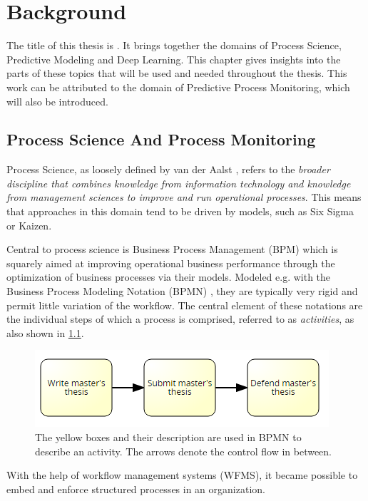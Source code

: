 \chapter{Background}\label{chap:background}
The title of this thesis is \textit{\thesisTitle}.
It brings together the domains of Process Science, Predictive Modeling and Deep Learning.
This chapter gives insights into the parts of these topics that will be used and needed throughout the thesis.
This work can be attributed to the domain of Predictive Process Monitoring, which will also be introduced.

\section{Process Science And Process Monitoring}
Process Science, as loosely defined by van der Aalst \cite{Aalst2016}, refers to the \textit{broader discipline that combines knowledge from information technology and knowledge from management sciences to improve and run operational processes}. This means that approaches in this domain tend to be driven by models, such as Six Sigma or Kaizen.

Central to process science is Business Process Management (BPM) which is squarely aimed at improving operational business performance through the optimization of business processes via their models.
Modeled e.g. with the Business Process Modeling Notation (BPMN) \cite{bpmn2.0}, they are typically very rigid and permit little variation of the workflow. The central element of these notations are the individual steps of which a process is comprised, referred to as \textit{activities}, as also shown in \ref{fig:activity-introduction}.

\begin{figure}
    \centering
    \includegraphics[width=.75\textwidth]{gfx/activity-introduction.png}
    \caption{The yellow boxes and their description are used in BPMN to describe an activity. The arrows denote the control flow in between.}
    \label{fig:activity-introduction}
\end{figure}

With the help of workflow management systems (WFMS), it became possible to embed and enforce structured processes in an organization.

